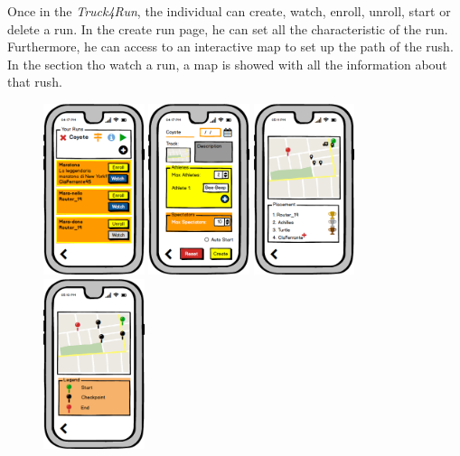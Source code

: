 \documentclass[a4paper]{article}
\begin{document}
\newpage
        
Once in the \textit{Truck4Run}, the individual can create, watch, enroll, unroll, start or delete a run. 
\newline
In the create run page, he can set all the characteristic of the run. Furthermore, he can access to an interactive map to set up the path of the rush.
\newline
In the section tho watch a run, a map is showed with all the information about that rush.

        \begin{figure}[!htpb]
    	\centering
    	\includegraphics[height=50mm]{images/mockups/RunManager.png}
    	\includegraphics[height=50mm]{images/mockups/RunCreate.png}
    	\includegraphics[height=50mm]{images/mockups/ShowMap.png}
    	\includegraphics[height=50mm]{images/mockups/DefineTrack.png}
        \end{figure}
      
\end{document}
